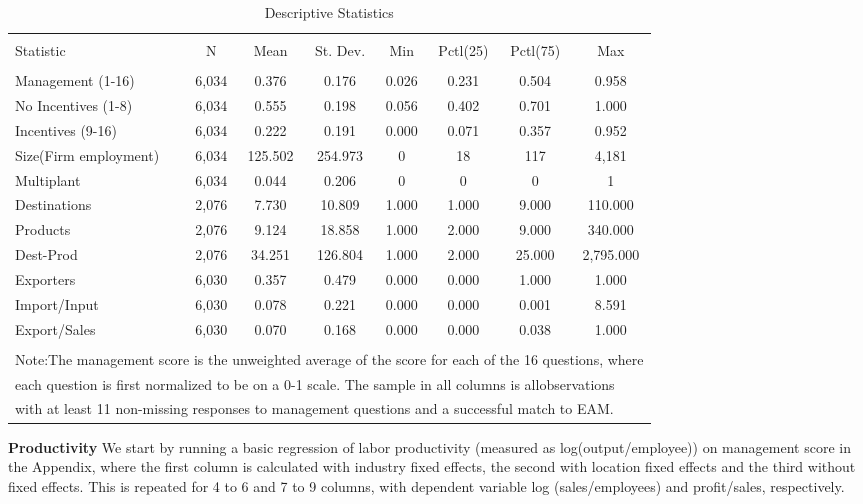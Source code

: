 \documentclass{article}
\begin{document}
\begin{table}[!htbp] \centering 
  \caption{Descriptive Statistics} 
  \label{} 
\begin{tabular}{@{\extracolsep{5pt}}lccccccc} 
\\[-1.8ex]\hline 
\hline \\[-1.8ex] 
Statistic & \multicolumn{1}{c}{N} & \multicolumn{1}{c}{Mean} & \multicolumn{1}{c}{St. Dev.} & \multicolumn{1}{c}{Min} & \multicolumn{1}{c}{Pctl(25)} & \multicolumn{1}{c}{Pctl(75)} & \multicolumn{1}{c}{Max} \\ 
\hline \\[-1.8ex] 
Management (1-16) & 6,034 & 0.376 & 0.176 & 0.026 & 0.231 & 0.504 & 0.958 \\ 
No Incentives (1-8) & 6,034 & 0.555 & 0.198 & 0.056 & 0.402 & 0.701 & 1.000 \\ 
Incentives (9-16) & 6,034 & 0.222 & 0.191 & 0.000 & 0.071 & 0.357 & 0.952 \\ 
Size(Firm employment) & 6,034 & 125.502 & 254.973 & 0 & 18 & 117 & 4,181 \\ 
Multiplant & 6,034 & 0.044 & 0.206 & 0 & 0 & 0 & 1 \\ 
Destinations & 2,076 & 7.730 & 10.809 & 1.000 & 1.000 & 9.000 & 110.000 \\ 
Products & 2,076 & 9.124 & 18.858 & 1.000 & 2.000 & 9.000 & 340.000 \\ 
Dest-Prod & 2,076 & 34.251 & 126.804 & 1.000 & 2.000 & 25.000 & 2,795.000 \\ 
Exporters & 6,030 & 0.357 & 0.479 & 0.000 & 0.000 & 1.000 & 1.000 \\ 
Import/Input & 6,030 & 0.078 & 0.221 & 0.000 & 0.000 & 0.001 & 8.591 \\ 
Export/Sales & 6,030 & 0.070 & 0.168 & 0.000 & 0.000 & 0.038 & 1.000 \\ 
\hline \\[-1.8ex] 
\multicolumn{8}{l}{Note:The management score is the unweighted average of the score for each of the 16 questions, where} \\ 
\multicolumn{8}{l}{each question is first normalized to be on a 0-1 scale. The sample in all columns is allobservations} \\ 
\multicolumn{8}{l}{with at least 11 non-missing responses to management questions and a successful match to EAM.} \\ 
\end{tabular} 
\end{table} 


\textbf{Productivity}
We start by running a basic regression of labor productivity (measured as log(output/employee)) on management score in the Appendix, where the first column is calculated with industry fixed effects, the second with location fixed effects and the third without fixed effects. This is repeated for 4 to 6 and 7 to 9 columns, with dependent variable log (sales/employees) and profit/sales, respectively.
\end{document}
